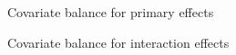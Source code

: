 


\begin{frame}{Covariate balance for primary effects}
\AlexanderBalance{}
\end{frame}


\begin{frame}{Covariate balance for interaction effects}
\AlexanderBalanceInteractions{}
\end{frame}



